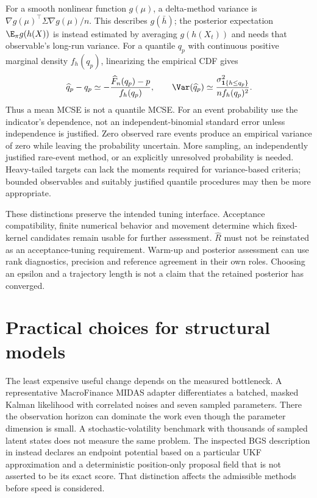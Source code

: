 For a smooth nonlinear function $g(\mu)$, a delta-method variance is
$\nabla g(\mu)^\top\Sigma\nabla g(\mu)/n$. This describes
$g(\bar h)$; the posterior expectation $\E_\pi g(h(X))$ is instead
estimated by averaging $g(h(X_t))$ and needs that observable's long-run
variance. For a quantile $q_p$ with continuous positive marginal density
$f_h(q_p)$, linearizing the empirical CDF gives
\begin{equation}
 \widehat q_p-q_p
 \simeq-\frac{\widehat F_n(q_p)-p}{f_h(q_p)},\qquad
 \Var(\widehat q_p)
 \simeq\frac{\sigma_{\mathbf1\{h\leq q_p\}}^2}
                    {n f_h(q_p)^2}.
 \label{eq:bf-modern-quantile-mcse}
\end{equation}
Thus a mean MCSE is not a quantile MCSE. For an event probability use the
indicator's dependence, not an independent-binomial standard error unless
independence is justified. Zero observed rare events produce an empirical
variance of zero while leaving the probability uncertain. More sampling,
an independently justified rare-event method, or an explicitly unresolved
probability is needed. Heavy-tailed targets can lack the moments required
for variance-based criteria; bounded observables and suitably justified
quantile procedures may then be more appropriate.

These distinctions preserve the intended tuning interface. Acceptance
compatibility, finite numerical behavior and movement determine which
fixed-kernel candidates remain usable for further assessment. $\widehat R$
must not be reinstated as an acceptance-tuning requirement. Warm-up and
posterior assessment can use rank diagnostics, precision and reference
agreement in their own roles. Choosing an epsilon and a trajectory length is
not a claim that the retained posterior has converged.

\section{Practical choices for structural models}
\label{sec:bf-modern-recommendations}

The least expensive useful change depends on the measured bottleneck.
A representative MacroFinance MIDAS adapter differentiates a batched,
masked Kalman likelihood with correlated noises and seven sampled
parameters. There the observation horizon can dominate the work even
though the parameter dimension is small. A stochastic-volatility benchmark
with thousands of sampled latent states does not measure the same problem.
The inspected BGS description in  instead declares an endpoint
potential based on a particular UKF approximation and a deterministic
position-only proposal field that is not asserted to be its exact score.
That distinction affects the admissible methods before speed is considered.

